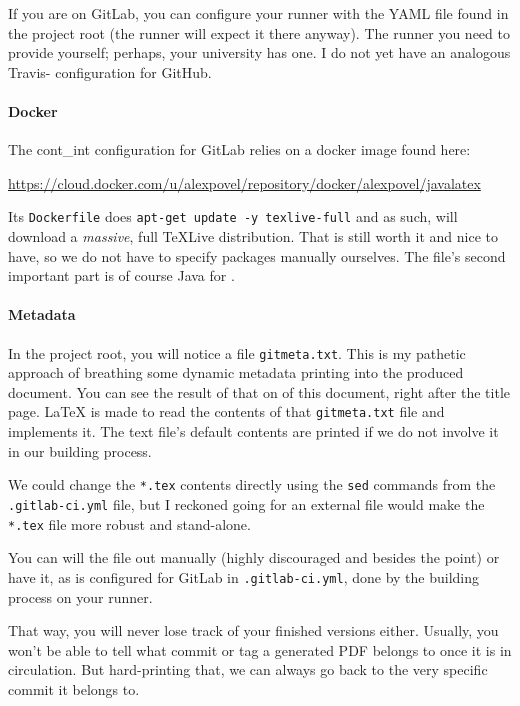 If you are on GitLab, you can configure your runner with the YAML file found in the project root (the runner will expect it there anyway).
The runner you need to provide yourself; perhaps, your university has one.
I do not yet have an analogous Travis- configuration for GitHub.

\paragraph{Docker}
The \gls{cont_int} configuration for GitLab relies on a docker image found here:
\begin{center}
	\url{https://cloud.docker.com/u/alexpovel/repository/docker/alexpovel/javalatex}
\end{center}
Its \texttt{Dockerfile} does \texttt{apt-get update -y texlive-full} and as such, will download a \emph{massive}, full TeXLive distribution.
That is still worth it and nice to have, so we do not have to specify packages manually ourselves.
The file's second important part is of course Java for .

\paragraph{Metadata}
In the project root, you will notice a file \texttt{gitmeta.txt}.
This is my pathetic approach of breathing some dynamic metadata printing into the produced document.
You can see the result of that on  of this document, right after the title page.
\LaTeX{} is made to read the contents of that \texttt{gitmeta.txt} file and implements it.
The text file's default contents are printed if we do not involve it in our building process.

We could change the \texttt{*.tex} contents directly using the \texttt{sed} commands from the \texttt{.gitlab-ci.yml} file, but I reckoned going for an external file would make the \texttt{*.tex} file more robust and stand-alone.

You can will the file out manually (highly discouraged and besides the point) or have it, as is configured for GitLab in \texttt{.gitlab-ci.yml}, done by the building process on your runner.

That way, you will never lose track of your finished versions either.
Usually, you won't be able to tell what commit or tag a generated PDF belongs to once it is in circulation.
But hard-printing that, we can always go back to the very specific commit it belongs to.

